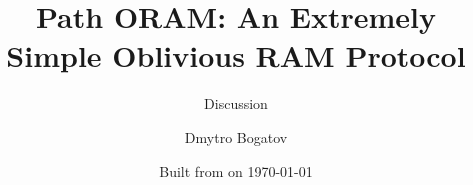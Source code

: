 
\title{Path ORAM: An Extremely Simple Oblivious RAM Protocol} %

\subtitle{Discussion}

\date{Built from \emph{} on \today}

\author{Dmytro Bogatov}



